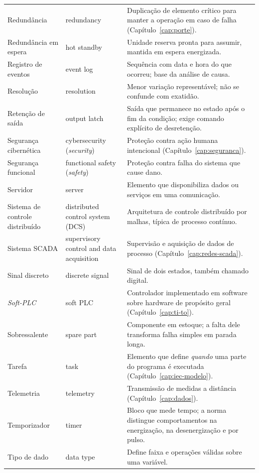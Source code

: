 \begin{longtable}{p{3.3cm} p{3.3cm} p{8.4cm}}
  Redundância & redundancy & Duplicação de elemento crítico para manter a operação em caso de
    falha (Capítulo~\ref{cap:porte}). \\
  Redundância em espera & hot standby & Unidade reserva pronta para assumir, mantida em espera
    energizada. \\
  Registro de eventos & event log & Sequência com data e hora do que ocorreu; base da análise de
    causa. \\
  Resolução & resolution & Menor variação representável; não se confunde com exatidão. \\
  Retenção de saída & output latch & Saída que permanece no estado após o fim da condição; exige
    comando explícito de desretenção. \\
  Segurança cibernética & cybersecurity (\emph{security}) & Proteção contra ação humana intencional
    (Capítulo~\ref{cap:seguranca}). \\
  Segurança funcional & functional safety (\emph{safety}) & Proteção contra falha do sistema que cause
    dano. \\
  Servidor & server & Elemento que disponibiliza dados ou serviços em uma comunicação. \\
  Sistema de controle distribuído & distributed control system (DCS) & Arquitetura de controle
    distribuído por malhas, típica de processo contínuo. \\
  Sistema SCADA & supervisory control and data acquisition & Supervisão e aquisição de dados de
    processo (Capítulo~\ref{cap:redes-scada}). \\
  Sinal discreto & discrete signal & Sinal de dois estados, também chamado digital. \\
  \emph{Soft-PLC} & soft PLC & Controlador implementado em software sobre hardware de propósito
    geral (Capítulo~\ref{cap:ti-to}). \\
  Sobressalente & spare part & Componente em estoque; a falta dele transforma falha simples em parada
    longa. \\
  Tarefa & task & Elemento que define \emph{quando} uma parte do programa é executada
    (Capítulo~\ref{cap:iec-modelo}). \\
  Telemetria & telemetry & Transmissão de medidas a distância (Capítulo~\ref{cap:dados}). \\
  Temporizador & timer & Bloco que mede tempo; a norma distingue comportamentos na energização, na
    desenergização e por pulso. \\
  Tipo de dado & data type & Define faixa e operações válidas sobre uma variável. \\

\end{longtable}
